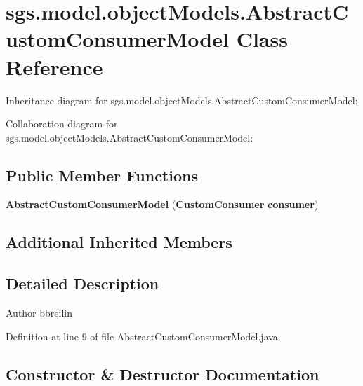 \section{sgs.\-model.\-object\-Models.\-Abstract\-Custom\-Consumer\-Model Class Reference}
\label{classsgs_1_1model_1_1object_models_1_1_abstract_custom_consumer_model}


Inheritance diagram for sgs.\-model.\-object\-Models.\-Abstract\-Custom\-Consumer\-Model\-:


Collaboration diagram for sgs.\-model.\-object\-Models.\-Abstract\-Custom\-Consumer\-Model\-:
\subsection*{Public Member Functions}
\begin{DoxyCompactItemize}
\item 
{\bf Abstract\-Custom\-Consumer\-Model} ({\bf Custom\-Consumer} {\bf consumer})
\end{DoxyCompactItemize}
\subsection*{Additional Inherited Members}


\subsection{Detailed Description}
\begin{DoxyAuthor}{Author}
bbreilin 
\end{DoxyAuthor}


Definition at line 9 of file Abstract\-Custom\-Consumer\-Model.\-java.



\subsection{Constructor \& Destructor Documentation}
